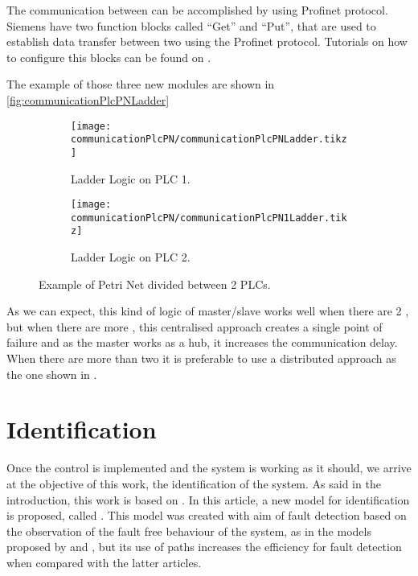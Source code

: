 The communication between \PLCs{} can be accomplished by using Profinet
protocol. Siemens \PLCs{} have two function blocks called ``Get'' and
``Put'', that are used to establish data transfer between two \PLCs{} using the
Profinet protocol. Tutorials on how to configure this blocks can be found on \citep{antunesfloriano2019sincronizacao,oliveira2016protocolo,rochapereira2019automacao}.

The example of those three new modules are shown in \autoref{fig:communicationPlcPNLadder}

\begin{figure}[H]
  \centering
  \begin{subfigure}[t]{0.45\textwidth}
    \centering
    \texttt{[image: communicationPlcPN/communicationPlcPNLadder.tikz]}
    \caption{Ladder Logic on PLC 1.}
    \label{fig:communicationPlcPN1Ladder}
  \end{subfigure}%
  \hfill
  \begin{subfigure}[t]{0.45\textwidth}
    \centering
    \texttt{[image: communicationPlcPN/communicationPlcPN1Ladder.tikz]}
    \caption{Ladder Logic on PLC 2.}
    \label{fig:communicationPlcPN2Ladder}
  \end{subfigure}
  \caption{Example of Petri Net divided between 2 PLCs.}
  \label{fig:communicationPlcPNLadder}
\end{figure}



As we can expect, this kind of logic of master\slash slave works well when
there are 2 \PLCs, but when there are more \PLCs, this centralised approach
creates a single point of failure and as the master \PLC{} works as a hub, it
increases the communication delay. When there are more than two \PLCs{} it is
preferable to use a distributed approach as the one shown in
\cite{antunesfloriano2019sincronizacao}.

\section{Identification}
\label{sec:identification}

Once the control is implemented and the system is working as it should, we
arrive at the objective of this work, the identification of the system.
As said in the introduction, this work is based on \cite{moreira2018enhanced}.
In this article, a new model for \DES{} identification is proposed, called
\DAOCT. This model was created with aim of fault detection based
on the observation of the fault free behaviour of the system, as in the models
proposed by 
\cite{roth2009fdi} and \cite{klein2005fault}, but its use of paths increases the
efficiency for fault detection when compared with the latter articles.

